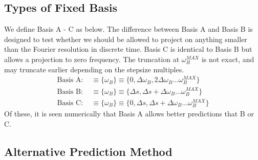 \subsection{Types of Fixed Basis}
We define Basis A - C as below. The  difference between Basis A and Basis B is designed to test whether we should be allowed to project on anything smaller than the Fourier resolution in discrete time. Basis C is identical to Basis B but allows a projection to zero frequency. The truncation at $\omega_B^{MAX}$ is not exact, and may truncate earlier depending on the stepsize multiples.
\begin{align}
\text{Basis A: } &\equiv \{\omega_B\} \equiv \{0, \Delta \omega_B, 2\Delta \omega_B \dots  \omega_B^{MAX}\} \\
\text{Basis B: } &\equiv \{\omega_B\} \equiv \{ \Delta s, \Delta s + \Delta \omega_B \dots  \omega_B^{MAX}\} \\
\text{Basis C: } &\equiv \{\omega_B\} \equiv \{ 0, \Delta s, \Delta s + \Delta \omega_B \dots  \omega_B^{MAX}\} 
\end{align}
Of these, it is seen numerically that Basis A allows better predictions that B or C.

\subsection{Alternative Prediction Method}


